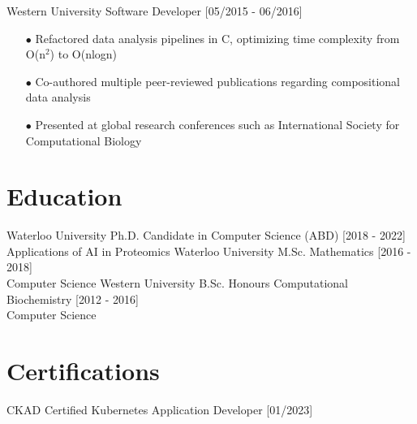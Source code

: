 \documentclass[]{twentysecondcv}
\begin{document}
\begin{twenty}
\twentyitem
    {Western University}
    {Software Developer}
    {[05/2015 - 06/2016]}
    {
    \begin{itemize}
        \item[$\bullet$] Refactored data analysis pipelines in C, optimizing time complexity from O(n$^2$) to O(nlogn) 
        \item[$\bullet$] Co-authored multiple peer-reviewed publications regarding compositional data analysis
        \item[$\bullet$]Presented at global research conferences such as International Society for Computational Biology
    \end{itemize}
}

\end{twenty}





\section{Education}
\vspace{-10px}
\begin{twenty}
  \twentyitem
    {Waterloo University}
    {Ph.D. Candidate in Computer Science (ABD)}
    {[2018 - 2022]}
    {\\ Applications of AI in Proteomics}
  \twentyitem
    {Waterloo University}
    {M.Sc. Mathematics}
    {[2016 - 2018]}
    {\\Computer Science}
  \twentyitem
    {Western University}
    {B.Sc. Honours Computational Biochemistry}
    {[2012 - 2016]}
    {\\Computer Science}
\end{twenty}


\section{Certifications}
\vspace{-12px}

\begin{twenty}
    \twentyitem
    {CKAD}
    {Certified Kubernetes Application Developer}
    {[01/2023]}
    {}
\end{twenty}

\end{document}
